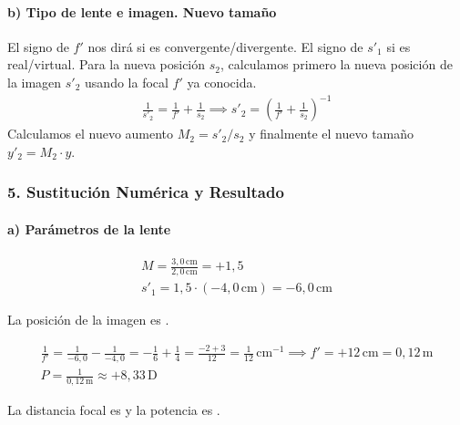 \paragraph*{b) Tipo de lente e imagen. Nuevo tamaño}
El signo de $f'$ nos dirá si es convergente/divergente. El signo de $s'_1$ si es real/virtual.
Para la nueva posición $s_2$, calculamos primero la nueva posición de la imagen $s'_2$ usando la focal $f'$ ya conocida.
\begin{gather}
    \frac{1}{s'_2} = \frac{1}{f'} + \frac{1}{s_2} \implies s'_2 = \left( \frac{1}{f'} + \frac{1}{s_2} \right)^{-1}
\end{gather}
Calculamos el nuevo aumento $M_2 = s'_2/s_2$ y finalmente el nuevo tamaño $y'_2 = M_2 \cdot y$.

\subsubsection*{5. Sustitución Numérica y Resultado}
\paragraph*{a) Parámetros de la lente}
\begin{gather}
    M = \frac{3,0 \, \text{cm}}{2,0 \, \text{cm}} = +1,5 \\
    s'_1 = 1,5 \cdot (-4,0 \, \text{cm}) = -6,0 \, \text{cm}
\end{gather}
\begin{cajaresultado}
    La posición de la imagen es .
\end{cajaresultado}
\begin{gather}
    \frac{1}{f'} = \frac{1}{-6,0} - \frac{1}{-4,0} = -\frac{1}{6} + \frac{1}{4} = \frac{-2+3}{12} = \frac{1}{12} \, \text{cm}^{-1} \implies f' = +12 \, \text{cm} = 0,12 \, \text{m} \\
    P = \frac{1}{0,12 \, \text{m}} \approx +8,33 \, \text{D}
\end{gather}
\begin{cajaresultado}
    La distancia focal es  y la potencia es .
\end{cajaresultado}
